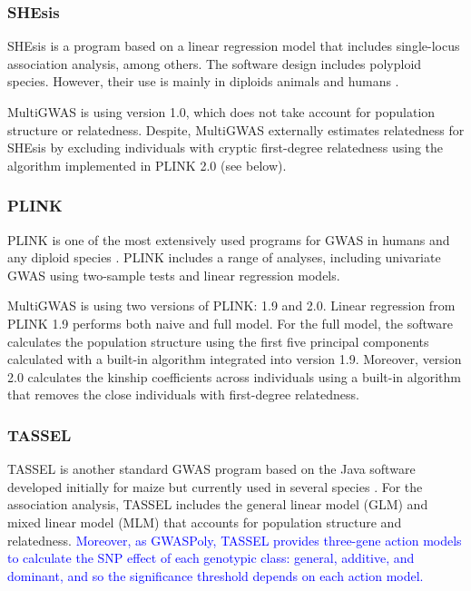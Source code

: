 \documentclass{article}
\begin{document}
\subsubsection{SHEsis}

SHEsis is a program based on a linear regression model that includes single-locus association analysis, among others. The software design includes polyploid species. However, their use is mainly in diploids animals and humans \cite{Qiao2015,Meng2019}.

MultiGWAS is using version 1.0, which does not take account for population structure or relatedness. Despite, MultiGWAS externally estimates relatedness for SHEsis by excluding individuals with cryptic first-degree relatedness using the algorithm implemented in PLINK 2.0 (see below).

\subsubsection{PLINK}
PLINK is one of the most extensively used programs for GWAS in humans and any diploid species \cite{Power2016}. PLINK includes a range of analyses, including univariate GWAS using two-sample tests and linear regression models.

MultiGWAS is using two versions of PLINK: 1.9 and 2.0. Linear regression from PLINK 1.9 performs both naive and full model. For the full model, the software calculates the population structure using the first five principal components calculated with a built-in algorithm integrated into version 1.9. Moreover, version 2.0 calculates the kinship coefficients across individuals using a built-in algorithm that removes the close individuals with first-degree relatedness.

\subsubsection{TASSEL}
TASSEL is another standard GWAS program based on the Java software developed initially for maize but currently used in several species \cite{Alvarez2017,Zhang2018}. For the association analysis, TASSEL includes the general linear model (GLM) and mixed linear model (MLM) that accounts for population structure and relatedness. \textcolor{blue}{Moreover, as GWASPoly, TASSEL provides three-gene action models to calculate the SNP effect of each genotypic class: general, additive, and dominant, and so the significance threshold depends on each action model.}
\end{document}
